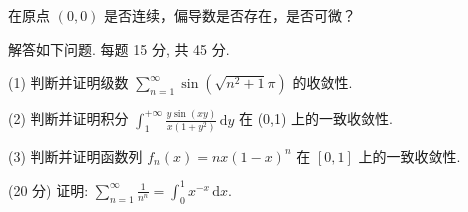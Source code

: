 在原点 $(0,0)$ 是否连续，偏导数是否存在，是否可微？\par
\par{}
解答如下问题. 每题 15 分, 共 45 分.\par
(1) 判断并证明级数 $\sum_{n=1}^{\infty} \sin(\sqrt{n^2 + 1}\pi)$ 的收敛性.\par
(2) 判断并证明积分 $\int_{1}^{+\infty} \frac{y \sin(xy)}{x(1 + y^2)} \, \mathrm{d}y$ 在 (0,1) 上的一致收敛性.\par
(3) 判断并证明函数列 $f_{n}(x) = nx(1 - x)^{n}$ 在 $[0, 1]$ 上的一致收敛性.\par
\par{}
(20 分) 证明: $\sum_{n=1}^{\infty} \frac{1}{n^n} = \int_0^1 x^{-x} \, \mathrm{d}x$.\par

